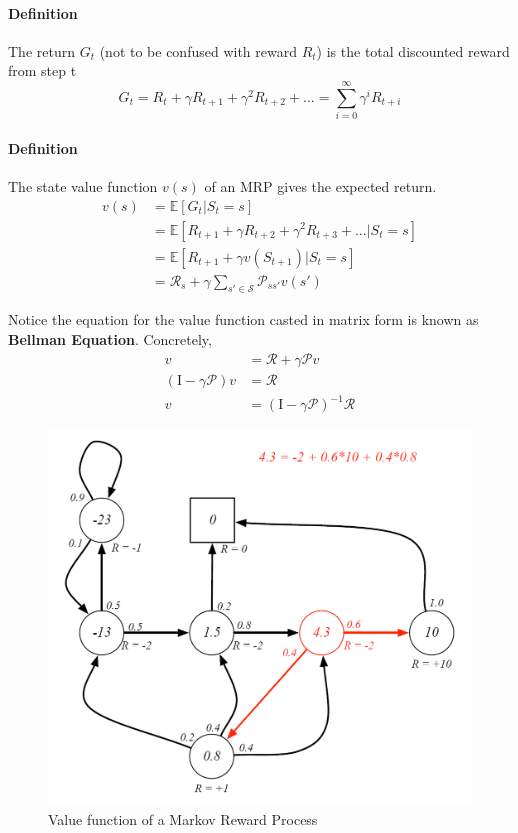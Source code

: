 \documentclass{article}
\begin{document}
	\paragraph{Definition} The return $G_t$ (not to be confused with reward $R_t$) is the total discounted reward from step t
	\begin{equation*}
	G_t = R_t + \gamma R_{t+1} + \gamma^2 R_{t+2} + ... = \sum^\infty_{i=0} \gamma^i R_{t+i}
	\end{equation*}
	
	\paragraph{Definition} The state value function $v(s)$ of an MRP gives the expected return.
	\begin{align*}
	v(s) &= \mathbb{E}[G_t | S_t = s] \\
	&= \mathbb{E}[R_{t+1} + \gamma R_{t+2} + \gamma^2 R_{t+3} + ... | S_t = s] \\
	&= \mathbb{E}[R_{t+1} + \gamma v(S_{t+1}) | S_t = s] \\
	&= \mathcal{R}_s + \gamma\sum_{s' \in \mathcal{S}}\mathcal{P}_{ss'}v(s')
	\end{align*}
	
	Notice the equation for the value function casted in matrix form is known as \textbf{Bellman Equation}. Concretely,
	\begin{align*}
	v &= \mathcal{R + \gamma P}v \\
	(\mathrm{I}- \gamma\mathcal{P})v &= \mathcal{R} \\
	v &= (\mathrm{I}- \gamma\mathcal{P})^{-1}\mathcal{R}
	\end{align*} 
	\begin{figure}[h]
		\centering
		\includegraphics[scale=0.5]{ch2fig1.png}
		\caption{Value function of a Markov Reward Process}
	\end{figure}
	
\end{document}
